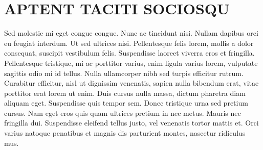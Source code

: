 \chapter{APTENT TACITI SOCIOSQU}

Sed molestie mi eget congue congue. Nunc ac tincidunt nisi. Nullam dapibus orci eu feugiat interdum. Ut sed ultrices nisi. Pellentesque felis lorem, mollis a dolor consequat, suscipit vestibulum felis. Suspendisse laoreet viverra eros et fringilla. Pellentesque tristique, mi ac porttitor varius, enim ligula varius lorem, vulputate sagittis odio mi id tellus. Nulla ullamcorper nibh sed turpis efficitur rutrum. Curabitur efficitur, nisl ut dignissim venenatis, sapien nulla bibendum erat, vitae porttitor erat lorem ut enim. Duis cursus nulla massa, dictum pharetra diam aliquam eget. Suspendisse quis tempor sem. Donec tristique urna sed pretium cursus. Nam eget eros quis quam ultrices pretium in nec metus. Mauris nec fringilla dui. Suspendisse eleifend tellus justo, vel venenatis tortor mattis et. Orci varius natoque penatibus et magnis dis parturient montes, nascetur ridiculus mus.